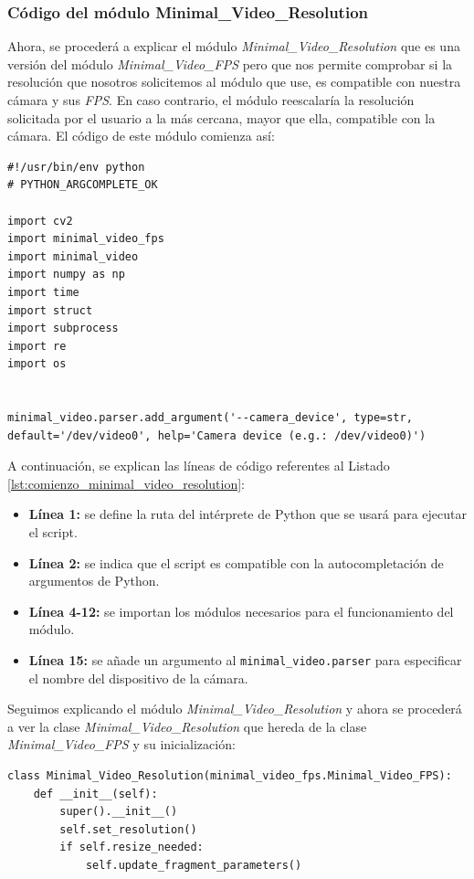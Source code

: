 \newpage

\subsubsection{Código del módulo Minimal\_Video\_Resolution}
Ahora, se procederá a explicar el módulo \textit{Minimal\_Video\_Resolution} que es una versión del módulo \textit{Minimal\_Video\_FPS} pero que nos permite comprobar si la resolución que nosotros solicitemos al módulo que use, es compatible con nuestra cámara y sus \textit{FPS}. En caso contrario, el módulo reescalaría la resolución solicitada por el usuario a la más cercana, mayor que ella, compatible con la cámara. El código de este módulo comienza así:

\begin{lstlisting}[style=pythonstyle, caption={Comienzo del módulo Minimal\_Video\_Resolution.}, label={lst:comienzo_minimal_video_resolution}]
#!/usr/bin/env python
# PYTHON_ARGCOMPLETE_OK

import cv2
import minimal_video_fps
import minimal_video
import numpy as np
import time
import struct
import subprocess
import re
import os


minimal_video.parser.add_argument('--camera_device', type=str, default='/dev/video0', help='Camera device (e.g.: /dev/video0)')   

\end{lstlisting}
\vspace{\baselineskip}

A continuación, se explican las líneas de código referentes al Listado \ref{lst:comienzo_minimal_video_resolution}:
\begin{itemize}
    \item \textbf{Línea 1:} se define la ruta del intérprete de Python que se usará para ejecutar el script.
    \item \textbf{Línea 2:} se indica que el script es compatible con la autocompletación de argumentos de Python.
    \item \textbf{Línea 4-12:} se importan los módulos necesarios para el funcionamiento del módulo.
    \item \textbf{Línea 15:} se añade un argumento al \texttt{minimal\_video.parser} para especificar el nombre del dispositivo de la cámara.
\end{itemize}
\vspace{\baselineskip}

Seguimos explicando el módulo \textit{Minimal\_Video\_Resolution} y ahora se procederá a ver la clase \textit{Minimal\_Video\_Resolution} que hereda de la clase \textit{Minimal\_Video\_FPS} y su inicialización:
\begin{lstlisting}[style=pythonstyle, caption={Clase e inicialización Minimal\_Video\_Resolution.}, label={lst:class_minimal_video_resolution}]
class Minimal_Video_Resolution(minimal_video_fps.Minimal_Video_FPS):
    def __init__(self):
        super().__init__()
        self.set_resolution()
        if self.resize_needed:
            self.update_fragment_parameters()
\end{lstlisting}
\vspace{\baselineskip}

